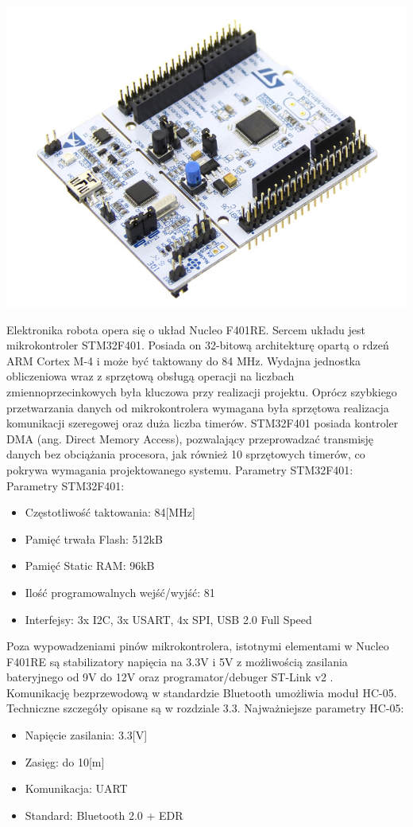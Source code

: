 \documentclass[eng,printmode]{mgr}
\begin{document}
  \begin{center}
   \includegraphics[width=1\textwidth]{images/nucleo}
  \end{center} 

Elektronika robota opera się o układ Nucleo F401RE. Sercem układu jest mikrokontroler STM32F401. Posiada on 32-bitową architekturę opartą o rdzeń ARM Cortex M-4 i może być taktowany do 84 MHz. Wydajna jednostka obliczeniowa wraz z sprzętową obsługą operacji na liczbach zmiennoprzecinkowych była kluczowa przy realizacji projektu. Oprócz szybkiego przetwarzania danych od mikrokontrolera wymagana była sprzętowa realizacja komunikacji szeregowej oraz duża liczba timerów. STM32F401 posiada kontroler DMA (ang. Direct Memory Access), pozwalający przeprowadzać transmisję danych bez obciążania procesora, jak również 10 sprzętowych timerów, co pokrywa wymagania projektowanego systemu.
Parametry STM32F401:
\newline Parametry STM32F401:
\begin{itemize}
  \item Częstotliwość taktowania: 84[MHz]
  \item Pamięć trwała Flash: 512kB
  \item Pamięć Static RAM: 96kB
  \item Ilość programowalnych wejść/wyjść: 81
  \item Interfejsy: 3x I2C, 3x USART, 4x SPI, USB 2.0 Full Speed
\end{itemize}

Poza wypowadzeniami pinów mikrokontrolera, istotnymi elementami w Nucleo F401RE są stabilizatory napięcia na 3.3V i 5V z możliwością zasilania bateryjnego od 9V do 12V oraz programator/debuger ST-Link v2 . 
\\Komunikację bezprzewodową w standardzie Bluetooth umożliwia moduł HC-05. Techniczne szczegóły opisane są w rozdziale 3.3. Najważniejsze parametry HC-05:
\begin{itemize}
  \item Napięcie zasilania: 3.3[V]
  \item Zasięg: do 10[m]
  \item Komunikacja: UART
  \item Standard: Bluetooth 2.0 + EDR
\end{itemize}
\end{document}
